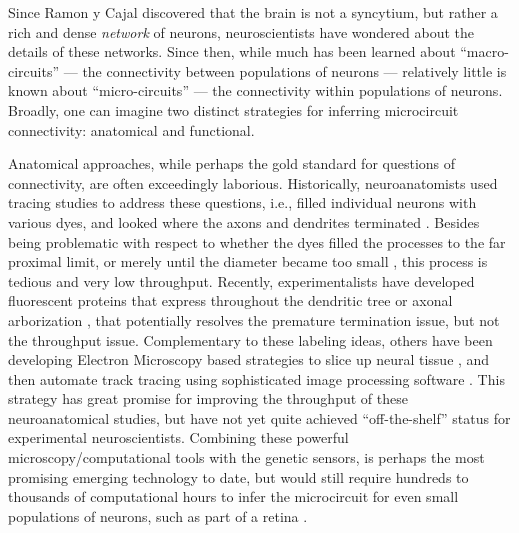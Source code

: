 Since Ramon y Cajal discovered that the brain is not a syncytium, but rather a rich and dense \emph{network} of neurons, neuroscientists have wondered about the details of these networks.  Since then, while much has been learned about ``macro-circuits''  --- the connectivity between populations of neurons --- relatively little is known about ``micro-circuits'' --- the connectivity within populations of neurons. Broadly, one can imagine two distinct strategies for inferring microcircuit connectivity: anatomical and functional.  

Anatomical approaches, while perhaps the gold standard for questions of connectivity, are often exceedingly laborious.  Historically, neuroanatomists used tracing studies to address these questions,  i.e., filled individual neurons with various dyes, and looked where the axons and dendrites terminated \cite{??}.  Besides being problematic with respect to whether the dyes filled the processes to the far proximal limit, or merely until the diameter became too small \cite{??}, this process is tedious and very low throughput.  Recently, experimentalists have developed fluorescent proteins that express throughout the dendritic tree \cite{??} or axonal arborization \cite{??}, that potentially resolves the premature termination issue, but not the throughput issue. Complementary to these labeling ideas, others have been developing Electron Microscopy based strategies to slice up neural tissue \cite{??}, and then automate track tracing using sophisticated image processing software \cite{??}.  This strategy has great promise for improving the throughput of these neuroanatomical studies, but have not yet quite achieved ``off-the-shelf'' status for experimental neuroscientists.  Combining these powerful microscopy/computational tools with the genetic sensors, is perhaps the most promising emerging technology to date, but would still require hundreds to thousands of computational hours to infer the microcircuit for even small populations of neurons, such as part of a retina \cite{??}.

